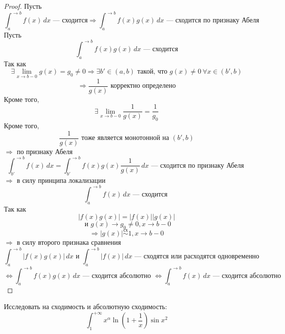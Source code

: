 \documentclass[11pt]{article}
\begin{document}
\begin{proof}
    Пусть 
    \[ \int_{a}^{\to b} f(x)\, dx \text{ --- сходится} \Rightarrow \int_{a}^{\to b} f(x)g(x)\, dx \text{ --- сходится по признаку Абеля} \]
    Пусть 
    \[ \int_{a}^{\to b} f(x)g(x)\, dx \text{ --- сходится} \]
    Так как 
    \[ \exists \lim\limits_{x\to b-0} g(x) = g_0 \neq 0 \Rightarrow \exists b'\in (a,b) \text{ такой, что } g(x) \neq 0 \ \forall x\in (b',b) \]  
    \[ \Rightarrow \frac{1}{g(x)} \text{ корректно определено} \]
    Кроме того, 
    \[ \exists \lim\limits_{x\to b-0} \frac{1}{g(x)} = \frac{1}{g_0} \]
    Кроме того, 
    \[ \frac{1}{g(x)} \text{ тоже является монотонной на } (b',b) \]
    $\Rightarrow$ по признаку Абеля 
    \[ \int_{b'}^{\to b} f(x)\, dx = \int_{b'}^{\to b} f(x) g(x) \frac{1}{g(x)} \, dx \text{ --- сходится по признаку Абеля } \] 
    $\Rightarrow$ в силу принципа локализации 
    \[ \int_{a}^{\to b} f(x)\, dx \text{ --- сходится } \]
    Так как 
    \[ |f(x)g(x)| = |f(x)| |g(x)| \] 
    \[ \text{ и } g(x)\to g_0\neq 0, x\to b-0 \] 
    \[ \Rightarrow |g(x)| \overset{\text{сх}}{\sim} 1, x\to b-0 \]
    $\Rightarrow$ в силу второго признака сравнения
    \[ \int_{a}^{\to b} |f(x)g(x)|\, dx \text{ и } \int_{a}^{\to b} |f(x)|\, dx \text{ --- сходятся или расходятся одновременно } \]
    \[ \Leftrightarrow \int_{a}^{\to b} f(x)g(x)\, dx \text{ --- сходится абсолютно } \Leftrightarrow \int_{a}^{\to b} f(x)\, dx \text{ --- сходится абсолютно} \]
\end{proof}
 
\begin{example}
    Исследовать на сходимость и абсолютную сходимость:
    \[ \int_{1}^{+\infty }x^\alpha \ln (1+\frac{1}{x}) \sin x^2 \]
\end{example}
\end{document}
